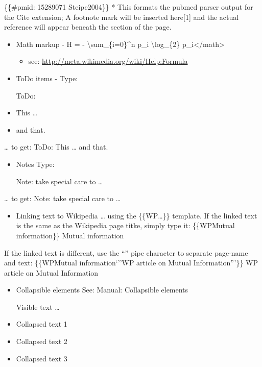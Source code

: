 \documentclass[]{book}
\providecommand{\tightlist}{%
  \setlength{\itemsep}{0pt}\setlength{\parskip}{0pt}}
\begin{document}
\{\{\#pmid: 15289071 \textbar{}Steipe2004\}\} * This formats the pubmed
parser output for the Cite extension; A footnote mark will be inserted
here{[}1{]} and the actual reference will appear beneath the section of
the page.

\begin{itemize}
\tightlist
\item
  Math markup - H = - \textbackslash{}sum\_\{i=0\}\^{}n p\_i
  \textbackslash{}log\_\{2\} p\_i\textless{}/math\textgreater{}

  \begin{itemize}
  \tightlist
  \item
    see: \url{http://meta.wikimedia.org/wiki/Help:Formula}
  \end{itemize}
\item
  ToDo items - Type:

  ToDo:
\item
  This \ldots{}
\item
  and that.
\end{itemize}

\ldots{} to get: ToDo: This \ldots{} and that.

\begin{itemize}
\tightlist
\item
  Notes Type:

  Note: take special care to \ldots{}
\end{itemize}

\ldots{} to get: Note: take special care to \ldots{}

\begin{itemize}
\tightlist
\item
  Linking text to Wikipedia \ldots{} using the
  \{\{WP\textbar{}\ldots{}\}\} template. If the linked text is the same
  as the Wikipedia page titke, simply type it: \{\{WP\textbar{}Mutual
  information\}\} Mutual information
\end{itemize}

If the linked text is different, use the ``\textbar{}'' pipe character
to separate page-name and text: \{\{WP\textbar{}Mutual
information\textbar{}`''WP article on Mutual Information'''\}\} WP
article on Mutual Information

\begin{itemize}
\tightlist
\item
  Collapsible elements See: Manual: Collapsible elements

  Visible text \ldots{}
\item
  Collapsed text 1
\item
  Collapsed text 2
\item
  Collapsed text 3
\end{itemize}
\end{document}
